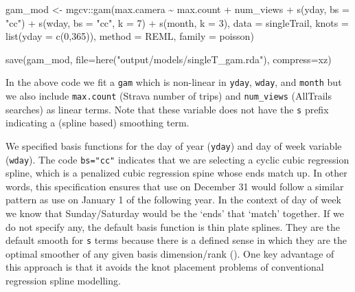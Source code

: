 \documentclass[
]{book}
\newenvironment{Shaded}{\begin{snugshade}}{\end{snugshade}}
\newcommand{\AttributeTok}[1]{\textcolor[rgb]{0.77,0.63,0.00}{#1}}
\newcommand{\DecValTok}[1]{\textcolor[rgb]{0.00,0.00,0.81}{#1}}
\newcommand{\FunctionTok}[1]{\textcolor[rgb]{0.00,0.00,0.00}{#1}}
\newcommand{\NormalTok}[1]{#1}
\newcommand{\OtherTok}[1]{\textcolor[rgb]{0.56,0.35,0.01}{#1}}
\newcommand{\SpecialCharTok}[1]{\textcolor[rgb]{0.00,0.00,0.00}{#1}}
\newcommand{\StringTok}[1]{\textcolor[rgb]{0.31,0.60,0.02}{#1}}
\begin{document}
\begin{Shaded}
\begin{Highlighting}[]
\NormalTok{gam\_mod }\OtherTok{\textless{}{-}}\NormalTok{ mgcv}\SpecialCharTok{::}\FunctionTok{gam}\NormalTok{(max.camera }\SpecialCharTok{\textasciitilde{}} 
\NormalTok{                       max.count }\SpecialCharTok{+}
\NormalTok{                       num\_views }\SpecialCharTok{+}
                       \FunctionTok{s}\NormalTok{(yday, }\AttributeTok{bs =} \StringTok{"cc"}\NormalTok{) }\SpecialCharTok{+} 
                       \FunctionTok{s}\NormalTok{(wday, }\AttributeTok{bs =} \StringTok{"cc"}\NormalTok{,  }\AttributeTok{k =} \DecValTok{7}\NormalTok{) }\SpecialCharTok{+}
                       \FunctionTok{s}\NormalTok{(month, }\AttributeTok{k =} \DecValTok{3}\NormalTok{), }
                     \AttributeTok{data =}\NormalTok{ singleTrail, }
                     \AttributeTok{knots =} \FunctionTok{list}\NormalTok{(}\AttributeTok{yday =} \FunctionTok{c}\NormalTok{(}\DecValTok{0}\NormalTok{,}\DecValTok{365}\NormalTok{)),}
                     \AttributeTok{method =} \StringTok{\textquotesingle{}REML\textquotesingle{}}\NormalTok{,}
                     \AttributeTok{family =}\NormalTok{ poisson)}

\FunctionTok{save}\NormalTok{(gam\_mod, }
     \AttributeTok{file=}\FunctionTok{here}\NormalTok{(}\StringTok{"output/models/singleT\_gam.rda"}\NormalTok{), }
     \AttributeTok{compress=}\StringTok{\textquotesingle{}xz\textquotesingle{}}\NormalTok{)}
\end{Highlighting}
\end{Shaded}

In the above code we fit a \texttt{gam} which is non-linear in \texttt{yday}, \texttt{wday}, and \texttt{month} but we also include \texttt{max.count} (Strava number of trips) and \texttt{num\_views} (AllTrails searches) as linear terms. Note that these variable does not have the \texttt{s} prefix indicating a (spline based) smoothing term.

We specified basis functions for the day of year (\texttt{yday}) and day of week variable (\texttt{wday}). The code \texttt{bs="cc"} indicates that we are selecting a cyclic cubic regression spline, which is a penalized cubic regression spine whose ends match up. In other words, this specification ensures that use on December 31 would follow a similar pattern as use on January 1 of the following year. In the context of day of week we know that Sunday/Saturday would be the `ends' that `match' together. If we do not specify any, the default basis function is thin plate splines. They are the default smooth for \texttt{s} terms because there is a defined sense in which they are the optimal smoother of any given basis dimension/rank (\citep{R-Wood5}). One key advantage of this approach is that it avoids the knot placement problems of conventional regression spline modelling.
\end{document}

